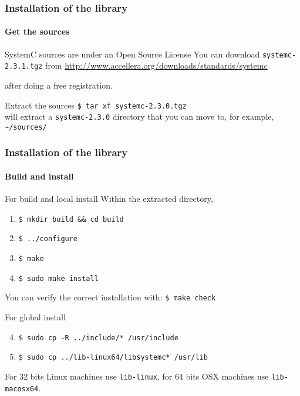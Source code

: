 \begin{frame}
\frametitle{Installation of the library}
\framesubtitle{Get the sources}

\begin{block}{SystemC sources are under an Open Source License}
You can download \texttt{systemc-2.3.1.tgz} from 
{ \scriptsize
\url{http://www.accellera.org/downloads/standards/systemc}
}
\medskip 

after doing a free registration.
\end{block}
\begin{block}{Extract the sources}
\texttt{\$ tar xf systemc-2.3.0.tgz} \\
will extract a \texttt{systemc-2.3.0} directory that you can move to, for example,
\texttt{\textasciitilde{}/sources/}
\end{block}

\end{frame}

\begin{frame}
\frametitle{Installation of the library}
\framesubtitle{Build and install}

\begin{block}{For build and local install}
Within the extracted directory,
\begin{enumerate}
\item \texttt{\$ mkdir build \&\& cd build}
\item \texttt{\$ ../configure}
\item \texttt{\$ make}
\item \texttt{\$ sudo make install}
\end{enumerate}
You can verify the correct installation with: \texttt{\$ make check}
\end{block}
\pause
\begin{block}{For global install}
\begin{enumerate}
\setcounter{enumi}{3}
\item \texttt{\$ sudo cp -R ../include/* /usr/include}
\item \texttt{\$ sudo cp ../lib-linux64/libsystemc* /usr/lib}
\end{enumerate}
For 32 bits Linux machines use \texttt{lib-linux}, for 64 bits OSX machines use \texttt{lib-macosx64}.
\end{block}

\end{frame}

